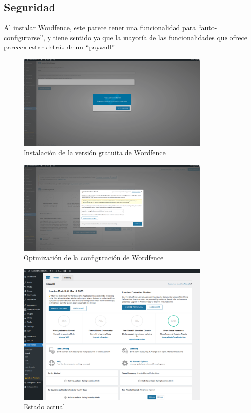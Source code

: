 \documentclass[a4paper]{article}
\begin{document}
\subsection{Seguridad}

Al instalar Wordfence, este parece tener una funcionalidad para ``auto-configurarse'', y tiene sentido ya que la mayoría de las funcionalidades que ofrece parecen estar detrás de un ``paywall''.

\begin{figure}[H]
    \centering
    \includegraphics[width=0.85\textwidth]{images/wordfence1.png}
    \caption{Instalación de la versión gratuita de Wordfence}
\end{figure}

\begin{figure}[H]
    \centering
    \includegraphics[width=0.85\textwidth]{images/wordfence2.png}
    \caption{Optmización de la configuración de Wordfence}
\end{figure}

\begin{figure}[H]
    \centering
    \includegraphics[width=0.85\textwidth]{images/wordfence3.png}
    \caption{Estado actual}
\end{figure}
\end{document}
